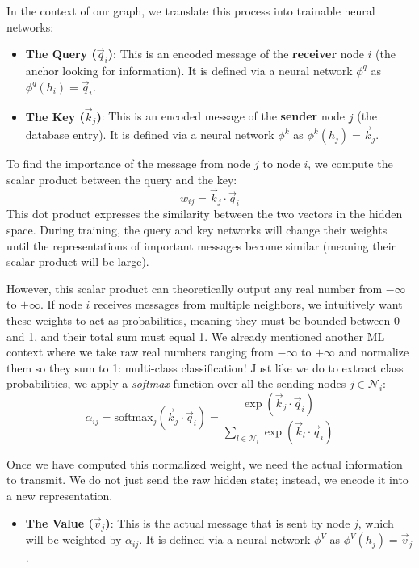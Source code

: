 In the context of our graph, we translate this process into trainable neural networks:
\begin{itemize}
    \item[-] \textbf{The Query ($\vec{q}_i$)}: This is an encoded message of the \textbf{receiver} node $i$ (the anchor looking for information). It is defined via a neural network $\phi^q$ as $\phi^q(h_i) = \vec{q}_i$.
    \item[-] \textbf{The Key ($\vec{k}_j$)}: This is an encoded message of the \textbf{sender} node $j$ (the database entry). It is defined via a neural network $\phi^k$ as $\phi^k(h_j) = \vec{k}_j$.
\end{itemize}

To find the importance of the message from node $j$ to node $i$, we compute the scalar product between the query and the key:
\begin{equation}
    w_{ij} = \vec{k}_j \cdot \vec{q}_i
\end{equation}
This dot product expresses the similarity between the two vectors in the hidden space. During training, the query and key networks will change their weights until the representations of important messages become similar (meaning their scalar product will be large). 

However, this scalar product can theoretically output any real number from $-\infty$ to $+\infty$. If node $i$ receives messages from multiple neighbors, we intuitively want these weights to act as probabilities, meaning they must be bounded between 0 and 1, and their total sum must equal  1. 
We already mentioned another ML context where we take raw real numbers ranging from $-\infty$ to $+\infty$ and normalize them so they sum to 1: multi-class classification! Just like we do to extract class probabilities, we apply a \textit{softmax} function over all the sending nodes $j \in \mathcal{N}_i$:
\begin{equation}
    \alpha_{ij} = \text{softmax}_j(\vec{k}_j \cdot \vec{q}_i) = \frac{\exp(\vec{k}_j \cdot \vec{q}_i)}{\sum_{l \in \mathcal{N}_i} \exp(\vec{k}_l \cdot \vec{q}_i)}
\end{equation}

Once we have computed this normalized weight, we need the actual information to transmit. We do not just send the raw hidden state; instead, we encode it into a new representation.
\begin{itemize}
    \item[-] \textbf{The Value ($\vec{v}_j$)}: This is the actual message that is sent by node $j$, which will be weighted by $\alpha_{ij}$. It is defined via a neural network $\phi^V$ as $\phi^V(h_j) = \vec{v}_j$. 
\end{itemize}

